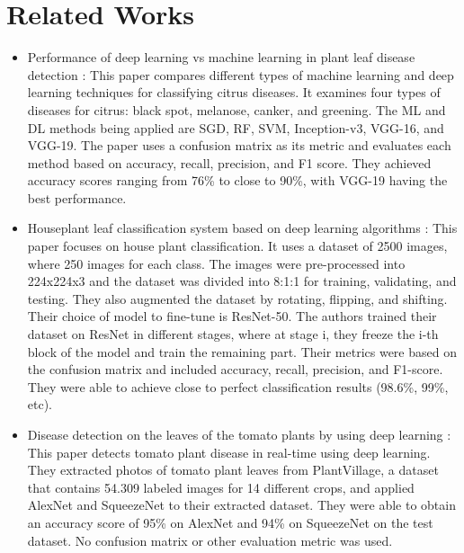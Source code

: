 \documentclass[12pt]{article}
\begin{document}
\section{Related Works}
\begin{itemize}
    \item Performance of deep learning vs machine learning in plant leaf disease detection \cite{Sujatha2020}: This paper compares different types of machine learning and deep learning techniques for classifying citrus diseases. It examines four types of diseases for citrus: black spot, melanose,  canker, and greening. The ML and DL methods being applied are SGD, RF, SVM, Inception-v3, VGG-16, and VGG-19. The paper uses a confusion matrix as its metric and evaluates each method based on accuracy, recall, precision, and F1 score. They achieved accuracy scores ranging from 76\% to close to 90\%, with VGG-19 having the best performance. 

    \item Houseplant leaf classification system based on deep learning algorithms \cite{Hama2024}:
    This paper focuses on house plant classification. It uses a dataset of 2500 images, where 250 images for each class. The images were pre-processed into 224x224x3 and the dataset was divided into 8:1:1 for training, validating, and testing. They also augmented the dataset by rotating, flipping, and shifting. Their choice of model to fine-tune is ResNet-50. The authors trained their dataset on ResNet in different stages, where at stage i, they freeze the i-th block of the model and train the remaining part. Their metrics were based on the confusion matrix and included accuracy, recall, precision, and F1-score. They were able to achieve close to perfect classification results (98.6\%, 99\%, etc).

    \item Disease detection on the leaves of the tomato plants by using deep learning \cite{Durmus2017}: This paper detects tomato plant disease in real-time using deep learning. They extracted photos of tomato plant leaves from PlantVillage, a dataset that contains 54.309 labeled images for 14 different crops, and applied AlexNet and SqueezeNet to their extracted dataset. They were able to obtain an accuracy score of 95\% on AlexNet and 94\% on SqueezeNet on the test dataset. No confusion matrix or other evaluation metric was used.

    
\end{itemize}
\end{document}
